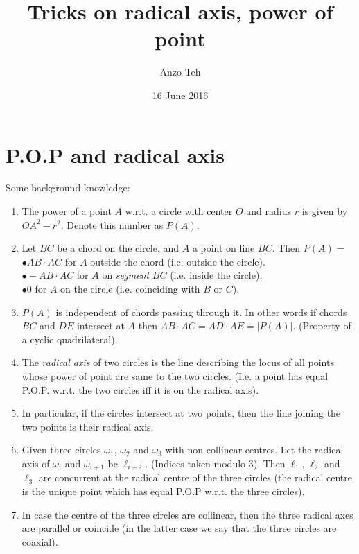 \documentclass[11pt,a4paper]{article}
\begin{document}
\title{Tricks on radical axis, power of point}
\author{Anzo Teh}
\date{16 June 2016}
\maketitle

\section {P.O.P and radical axis}
Some background knowledge:
\begin{enumerate}
\item The power of a point $A$ w.r.t. a circle with center $O$ and radius $r$ is given by $OA^2-r^2$. Denote this number as $P(A)$.
\item Let $BC$ be a chord on the circle, and $A$ a point on line $BC$. Then $P(A)=$\\
$\bullet AB\cdot AC$ for $A$ outside the chord (i.e. outside the circle).\\
$\bullet -AB\cdot AC$ for $A$ on \emph{segment} $BC$ (i.e. inside the circle).\\
$\bullet 0$ for $A$ on the circle (i.e. coinciding with $B$ or $C$).
\item $P(A)$ is independent of chords passing through it. In other words if chords $BC$ and $DE$ intersect at $A$ then $AB\cdot AC=AD\cdot AE=|P(A)|$. (Property of a cyclic quadrilateral).
\item The \emph{radical axis} of two circles is the line describing the locus of all points whose power of point are same to the two circles. (I.e. a point has equal P.O.P. w.r.t. the two circles iff it is on the radical axis).
\item In particular, if the circles intersect at two points, then the line joining the two points is their radical axis.
\item Given three circles $\omega_1$, $\omega_2$ and $\omega_3$ with non collinear centres. Let the radical axis of $\omega_i$ and $\omega_{i+1}$ be $\ell_{i+2}$. (Indices taken modulo 3). Then $\ell_1$, $\ell_2$ and $\ell_3$ are concurrent at the radical centre of the three circles (the radical centre is the unique point which has equal P.O.P w.r.t. the three circles).
\item In case the centre of the three circles are collinear, then the three radical axes are parallel or coincide (in the latter case we say that the three circles are coaxial).
\end{enumerate}
\end{document}
